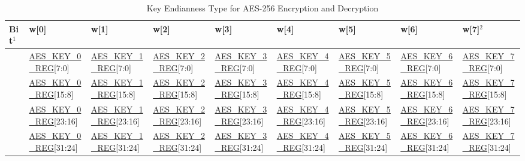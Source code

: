\documentclass[main\_\_EN.tex]{subfiles}
\begin{document}
\begin{landscape}


\begin{ThreePartTable}

\begin{longtable}[c]
{ |l|l|l|l|l|l|l|l|l|}
\caption{Key Endianness Type for AES-256 Encryption and Decryption}\label{tab:aes-256-key-endian}\\
\hline
\rowcolor{lightgray}
Bit$^1$ &   w[0]    &   w[1]    &   w[2]    &   w[3]    &   w[4]    &   w[5]&   w[6]    &   w[7]$^2$    \\\hline
[31:24]     &   \scriptsize \hyperref[regdesc:AESKEYnREG]{AES\_KEY\_0\_REG}[7:0]    &   \scriptsize \hyperref[regdesc:AESKEYnREG]{AES\_KEY\_1\_REG}[7:0]    &   \scriptsize \hyperref[regdesc:AESKEYnREG]{AES\_KEY\_2\_REG}[7:0]    &   \scriptsize \hyperref[regdesc:AESKEYnREG]{AES\_KEY\_3\_REG}[7:0]    &   \scriptsize \hyperref[regdesc:AESKEYnREG]{AES\_KEY\_4\_REG}[7:0]    &   \scriptsize \hyperref[regdesc:AESKEYnREG]{AES\_KEY\_5\_REG}[7:0]
& \scriptsize  \hyperref[regdesc:AESKEYnREG]{AES\_KEY\_6\_REG}[7:0]    &   \scriptsize \hyperref[regdesc:AESKEYnREG]{AES\_KEY\_7\_REG}[7:0]\\ \hline
[23:16]     &   \scriptsize \hyperref[regdesc:AESKEYnREG]{AES\_KEY\_0\_REG}[15:8]   &   \scriptsize \hyperref[regdesc:AESKEYnREG]{AES\_KEY\_1\_REG}[15:8]   &   \scriptsize \hyperref[regdesc:AESKEYnREG]{AES\_KEY\_2\_REG}[15:8]   &   \scriptsize \hyperref[regdesc:AESKEYnREG]{AES\_KEY\_3\_REG}[15:8]   &   \scriptsize \hyperref[regdesc:AESKEYnREG]{AES\_KEY\_4\_REG}[15:8]   &   \scriptsize \hyperref[regdesc:AESKEYnREG]{AES\_KEY\_5\_REG}[15:8]   &   \scriptsize \hyperref[regdesc:AESKEYnREG]{AES\_KEY\_6\_REG}[15:8]   &   \scriptsize \hyperref[regdesc:AESKEYnREG]{AES\_KEY\_7\_REG}[15:8]\\ \hline
[15:8]  &  \scriptsize \hyperref[regdesc:AESKEYnREG]{AES\_KEY\_0\_REG}[23:16]  &   \scriptsize \hyperref[regdesc:AESKEYnREG]{AES\_KEY\_1\_REG}[23:16]  &   \scriptsize \hyperref[regdesc:AESKEYnREG]{AES\_KEY\_2\_REG}[23:16]  &   \scriptsize \hyperref[regdesc:AESKEYnREG]{AES\_KEY\_3\_REG}[23:16]  &   \scriptsize \hyperref[regdesc:AESKEYnREG]{AES\_KEY\_4\_REG}[23:16]  &   \scriptsize \hyperref[regdesc:AESKEYnREG]{AES\_KEY\_5\_REG}[23:16]& \scriptsize \hyperref[regdesc:AESKEYnREG]{AES\_KEY\_6\_REG}[23:16]  &   \scriptsize \hyperref[regdesc:AESKEYnREG]{AES\_KEY\_7\_REG}[23:16]\\ \hline
[7:0]   &  \scriptsize \hyperref[regdesc:AESKEYnREG]{AES\_KEY\_0\_REG}[31:24]  &    \scriptsize \hyperref[regdesc:AESKEYnREG]{AES\_KEY\_1\_REG}[31:24]  & \scriptsize \hyperref[regdesc:AESKEYnREG]{AES\_KEY\_2\_REG}[31:24]    &   \scriptsize \hyperref[regdesc:AESKEYnREG]{AES\_KEY\_3\_REG}[31:24]  &   \scriptsize \hyperref[regdesc:AESKEYnREG]{AES\_KEY\_4\_REG}[31:24]  &   \scriptsize \hyperref[regdesc:AESKEYnREG]{AES\_KEY\_5\_REG}[31:24]& \scriptsize \hyperref[regdesc:AESKEYnREG]{AES\_KEY\_6\_REG}[31:24]  &   \scriptsize \hyperref[regdesc:AESKEYnREG]{AES\_KEY\_7\_REG}[31:24]\\ \hline

\end{longtable}
\end{ThreePartTable}
\end{landscape}
\end{document}
